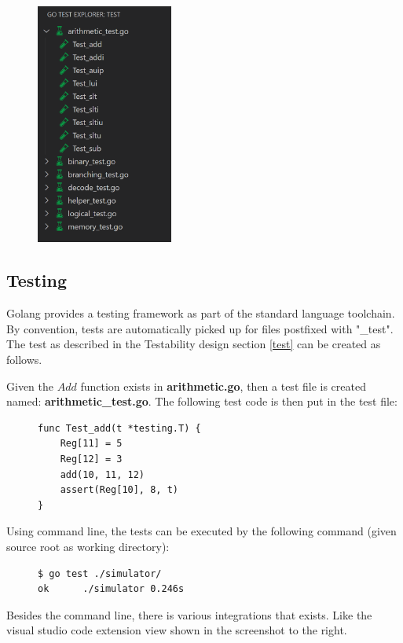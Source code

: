 \newpage

\begin{figure}
    \centering
    \includegraphics[width=0.4\textwidth]{images/test.png}
\end{figure}

\subsection{Testing}

Golang provides a testing framework as part of the standard language toolchain.
By convention, tests are automatically picked up for files postfixed with "\_test".
The test as described in the Testability design section \ref{test} can be created as follows.

Given the $Add$ function exists in \textbf{arithmetic.go}, then a test file is created named: \textbf{arithmetic\_test.go}.
The following test code is then put in the test file:
\begin{figure}[h]
\begin{verbatim}
func Test_add(t *testing.T) {
    Reg[11] = 5
    Reg[12] = 3
    add(10, 11, 12)
    assert(Reg[10], 8, t)
}
\end{verbatim}
\end{figure}

Using command line, the tests can be executed by the following command (given source root as working directory):

\begin{figure}[H]
\begin{verbatim}
$ go test ./simulator/
ok      ./simulator 0.246s
\end{verbatim}
\end{figure}

Besides the command line, there is various integrations that exists. Like the visual studio code extension view shown in the screenshot to the right.


\newpage